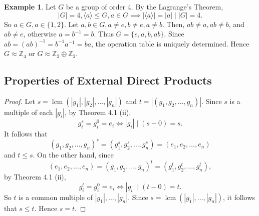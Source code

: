 \documentclass{article}
\DeclareMathOperator{\lcm}{lcm}
\newtheorem{theorem}{Theorem}[section]
\theoremstyle{definition}
\newtheorem{example}{Example}[section]
\begin{document}
     \begin{example}
     Let $G$ be a group of order 4. By the Lagrange's Theorem,
     \begin{equation*}
         |G| = 4, \langle a \rangle \leq G, a \in G \implies |\langle a \rangle| = |a| \mid |G| = 4.
     \end{equation*}
     So $a \in G, a \in \{1,2\}$. Let $a,b \in G, a \neq e, b \neq e, a \neq b$. Then, $ab \neq a, ab \neq b$, and $ab \neq e$, otherwise $a = b^{-1} = b$. Thus $G = \{e,a,b,ab\}$. Since $ab = (ab)^{-1} = b^{-1}a^{-1} = ba$, the operation table is uniquely determined. Hence $G \approx \mathbb{Z}_4$ or $G \approx \mathbb{Z}_2 \oplus \mathbb{Z}_2$.
     \end{example}
     
     \subsection{Properties of External Direct Products}
     \fbox{\parbox{\linewidth}{
     \begin{theorem}
        $|(g_1,g_2,\dots,g_n)| = \lcm(|g_1|,|g_2|,\dots,|g_n|)$.
     \end{theorem}
     }}
     
     \begin{proof}
        Let $s = \lcm(|g_1|,|g_2|,\dots,|g_n|)$ and $t = |(g_1,g_2,\dots,g_n)|$. Since $s$ is a multiple of each $|g_i|$, by Theorem 4.1 (ii),
        \begin{equation*}
            g_i^s = g_i^0 = e_i \iff |g_i| \mid (s-0) = s.
        \end{equation*}
        It follows that
        \begin{equation*}
            (g_1,g_2,\dots,g_n)^s = (g_1^s,g_2^s,\dots,g_n^s) = (e_1,e_2,\dots,e_n)
        \end{equation*}
        and $t \leq s$. On the other hand, since
        \begin{equation*}
            (e_1,e_2,\dots,e_n) = 
            (g_1,g_2,\dots,g_n)^t =
            (g_1^t,g_2^t,\dots,g_n^t),
        \end{equation*}
        by Theorem 4.1 (ii),
        \begin{equation*}
            g_i^t = g_i^0 = e_i \iff |g_i| \mid (t-0) = t.
        \end{equation*}
        So $t$ is a common multiple of $|g_1|,\dots,|g_n|$. Since $s = \lcm(|g_1|,\dots,|g_n|)$, it follows that $s \leq t$. Hence $s = t$.
     \end{proof}
     
\end{document}

